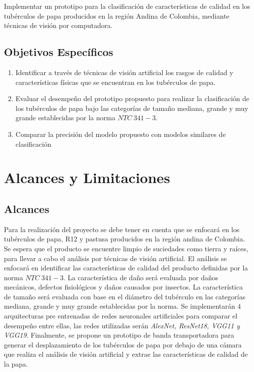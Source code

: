 Implementar un prototipo para la clasificación de características de calidad en los tubérculos de papa producidos en la región Andina de Colombia, mediante técnicas de visión por computadora.

\subsection{Objetivos Específicos}
\begin{enumerate}
	\item Identificar a través de técnicas de visión artificial los rasgos de calidad y características físicas que se encuentran en los tubérculos de papa. 
	\item Evaluar el desempeño del prototipo propuesto para realizar la clasificación de los tubérculos de papa bajo las categorías de tamaño mediana, grande y muy grande establecidas por la norma $NTC \ 341-3$. 
	\item Comparar la precisión del modelo propuesto con modelos similares de clasificación
\end{enumerate}

\section{Alcances y Limitaciones}

\subsection{Alcances}

Para la realización del proyecto se debe tener en cuenta que se enfocará en los tubérculos de papa, R12 y pastusa producidos en la región andina de Colombia. Se espera que el producto se encuentre limpio de suciedades como tierra y raíces, para llevar a cabo el análisis por técnicas de visión artificial. El análisis se enfocará en identificar las características de calidad del producto definidas por la norma $NTC \ 341-3$. La característica de daño será evaluada por daños mecánicos, defectos fisiológicos y daños causados por insectos. La característica de tamaño será evaluada con base en el diámetro del tubérculo en las categorías mediana, grande y muy grande establecidas por la norma. Se implementarán $4$ arquitecturas pre entrenadas de redes neuronales artificiales para comparar el desempeño entre ellas, las redes utilizadas serán \textit{AlexNet, ResNet18, VGG11 y VGG19}. Finalmente, se propone un prototipo de banda transportadora para generar el desplazamiento de los tubérculos de papa por debajo de una cámara que realiza el análisis de visión artificial y extrae las características de calidad de la papa.

